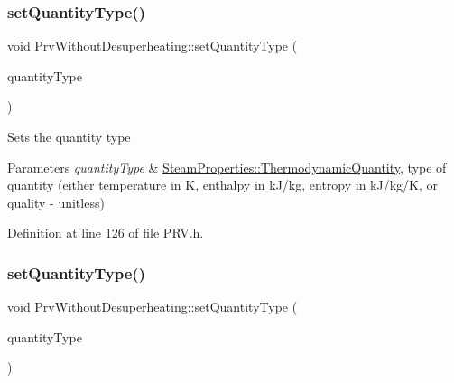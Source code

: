 \subsubsection{\texorpdfstring{set\+Quantity\+Type()}{setQuantityType()}\hspace{0.1cm}{\footnotesize\ttfamily [2/3]}}
{\footnotesize\ttfamily void Prv\+Without\+Desuperheating\+::set\+Quantity\+Type (\begin{DoxyParamCaption}\item[{\hyperlink{class_steam_properties_ae0294bedf7d178c2d8fb6aed0f62fbff}{Steam\+Properties\+::\+Thermodynamic\+Quantity}}]{quantity\+Type }\end{DoxyParamCaption})\hspace{0.3cm}{\ttfamily [inline]}}

Sets the quantity type


\begin{DoxyParams}{Parameters}
{\em quantity\+Type} & \hyperlink{class_steam_properties_ae0294bedf7d178c2d8fb6aed0f62fbff}{Steam\+Properties\+::\+Thermodynamic\+Quantity}, type of quantity (either temperature in K, enthalpy in k\+J/kg, entropy in k\+J/kg/K, or quality -\/ unitless) \\
\hline
\end{DoxyParams}


Definition at line 126 of file P\+R\+V.\+h.

\mbox{\label{class_prv_without_desuperheating_a212177b7a16c7452358df4120196c04b}} 
\subsubsection{\texorpdfstring{set\+Quantity\+Type()}{setQuantityType()}\hspace{0.1cm}{\footnotesize\ttfamily [3/3]}}
{\footnotesize\ttfamily void Prv\+Without\+Desuperheating\+::set\+Quantity\+Type (\begin{DoxyParamCaption}\item[{\hyperlink{class_steam_properties_ae0294bedf7d178c2d8fb6aed0f62fbff}{Steam\+Properties\+::\+Thermodynamic\+Quantity}}]{quantity\+Type }\end{DoxyParamCaption})\hspace{0.3cm}{\ttfamily [inline]}}

